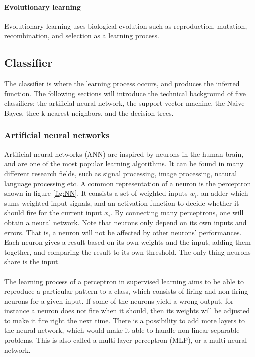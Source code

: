 \documentclass[USenglish]{ifimaster}  %
\begin{document}
\paragraph{Evolutionary learning}
Evolutionary learning uses biological evolution such as reproduction, mutation, recombination, and selection as a learning process.
	
 \subsection{Classifier} \label{sub:classifier}
The classifier is where the learning process occurs, and produces the inferred function. The following sections will introduce the technical background of five classifiers; the artificial neural network, the support vector machine, the Naive Bayes, thee k-nearest neighbors, and the decision trees.

\subsubsection{Artificial neural networks}
Artificial neural networks (ANN) are inspired by neurons in the human brain, and are one of the most popular learning algorithms. It can be found in many different research fields, such as signal processing, image processing, natural language processing etc. A common representation of a neuron is the perceptron shown in figure \ref{fig:NN}. It consists a set of weighted inputs $w_i$, an adder which sums weighted input signals, and an activation function to decide whether it should fire for the current input $x_i$. By connecting many perceptrons, one will obtain a neural network. Note that neurons only depend on its own inputs and errors. That is, a neuron will not be affected by other neurons’ performances. Each neuron gives a result based on its own weights and the input, adding them together, and comparing the result to its own threshold. The only thing neurons share is the input. 
\\
\\
The learning process of a perceptron in supervised learning aims to be able to reproduce a particular pattern to a class, which consists of firing and non-firing neurons for a given input. If some of the neurons yield a wrong output, for instance a neuron does not fire when it should, then its weights will be adjusted to make it fire right the next time. There is a possibility to add more layers to the neural network, which would make it able to handle non-linear separable problems. This is also called a multi-layer perceptron (MLP), or a multi neural network.
\end{document}
